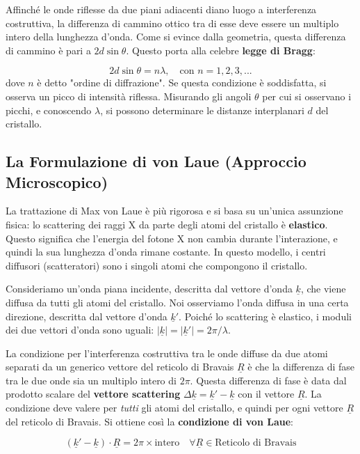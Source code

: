 Affinché le onde riflesse da due piani adiacenti diano luogo a interferenza costruttiva, la differenza di cammino ottico tra di esse deve essere un multiplo intero della lunghezza d'onda. Come si evince dalla geometria, questa differenza di cammino è pari a $2d\sin\theta$. Questo porta alla celebre \textbf{legge di Bragg}:

\begin{equation}
    2d\sin\theta = n\lambda, \quad \text{con } n = 1, 2, 3, ...
\end{equation}
dove $n$ è detto "ordine di diffrazione". Se questa condizione è soddisfatta, si osserva un picco di intensità riflessa. Misurando gli angoli $\theta$ per cui si osservano i picchi, e conoscendo $\lambda$, si possono determinare le distanze interplanari $d$ del cristallo.

\subsection{La Formulazione di von Laue (Approccio Microscopico)}
La trattazione di Max von Laue è più rigorosa e si basa su un'unica assunzione fisica: lo scattering dei raggi X da parte degli atomi del cristallo è \textbf{elastico}. Questo significa che l'energia del fotone X non cambia durante l'interazione, e quindi la sua lunghezza d'onda rimane costante. In questo modello, i centri diffusori (scatteratori) sono i singoli atomi che compongono il cristallo.

Consideriamo un'onda piana incidente, descritta dal vettore d'onda $\underline{k}$, che viene diffusa da tutti gli atomi del cristallo. Noi osserviamo l'onda diffusa in una certa direzione, descritta dal vettore d'onda $\underline{k}'$. Poiché lo scattering è elastico, i moduli dei due vettori d'onda sono uguali: $|\underline{k}| = |\underline{k}'| = 2\pi/\lambda$.

La condizione per l'interferenza costruttiva tra le onde diffuse da due atomi separati da un generico vettore del reticolo di Bravais $\underline{R}$ è che la differenza di fase tra le due onde sia un multiplo intero di $2\pi$. Questa differenza di fase è data dal prodotto scalare del \textbf{vettore scattering} $\Delta\underline{k} = \underline{k}' - \underline{k}$ con il vettore $\underline{R}$.
La condizione deve valere per \textit{tutti} gli atomi del cristallo, e quindi per ogni vettore $\underline{R}$ del reticolo di Bravais. Si ottiene così la \textbf{condizione di von Laue}:

\begin{equation}
    (\underline{k}' - \underline{k}) \cdot \underline{R} = 2\pi \times \text{intero} \quad \forall \underline{R} \in \text{Reticolo di Bravais}
\end{equation}

